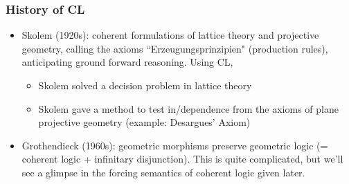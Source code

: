 \documentclass[handout,11pt]{beamer}
\begin{document}
\begin{frame}
\frametitle{History of CL}
 \begin{itemize}[<+->]   %
    \item Skolem (1920s): coherent formulations of lattice theory 
    and projective geometry, calling the axioms ``Erzeugungsprinzipien"
    (production rules), anticipating ground forward reasoning. Using CL,
    \begin{itemize}[<+->]   %
    \item Skolem solved a decision problem in lattice theory
    \item Skolem gave a method to test in/dependence from the axioms
    of plane projective geometry (example: Desargues' Axiom)
    \end{itemize}
    
    \item Grothendieck (1960s): geometric morphisms preserve geometric
              logic (= coherent logic + infinitary disjunction).
    This is quite complicated, but we'll see a glimpse
    in the forcing semantics of coherent logic given later.
 \end{itemize}
\end{frame}
\end{document}
